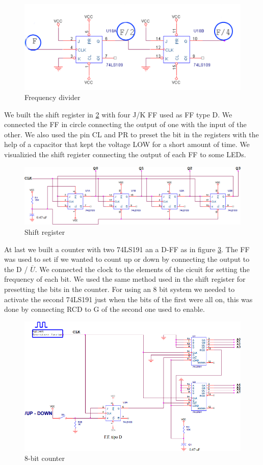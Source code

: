 \begin{figure}[H]
\centering
\includegraphics[width=.7\textwidth]{11/f_div.png}
\caption{Frequency divider}\label{f_div}
\end{figure}
We built the shift register in \ref{shift_reg} with four J/K FF used as FF type D. We connected the FF in circle connecting the output of one with the input of the other. We also used the pin CL and PR to preset the bit in the registers with the help of a capacitor that kept the voltage LOW for a short amount of time. We visualizied the shift register connecting the output of each FF to some LEDs.
\begin{figure}[H]
\centering
\includegraphics[width=.7\textwidth]{11/shift_reg.png}
\caption{Shift register}\label{shift_reg}

\end{figure}
At last we built a counter with two 74LS191 an a D-FF as in figure \ref{count}. The FF was  used to set if we wanted to count up or down by connecting the output to the D / $\overline{U}$. We connected the clock to the elements of the cicuit for  setting the frequency of each bit. We used the same method used in the shift register for presetting the bits in the counter. For using an 8 bit system we needed to activate the second 74LS191 just when the bits of the first were all on, this was done by connecting RCD to G of the second one used to enable.
\begin{figure}[H]
\centering
\includegraphics[width=.7\textwidth]{11/count.png}
\caption{8-bit counter}\label{count}
\end{figure}


